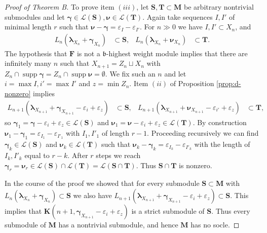 \documentclass[11pt,fleqn]{amsart}
\renewcommand\epsilon{\varepsilon}
\theoremstyle{definition}
\theoremstyle{remark}
\theoremstyle{remark}
\newcommand\lie[1]{\mathfrak{#1}}
\newcommand\wt[1]{\boldsymbol{#1}}
\DeclareMathOperator\supp{supp}
\begin{document}
\begin{proof}[Proof of Theorem B]
To prove item $(iii)$, let $\mathbf S, \mathbf T \subset \mathbf M$ be arbitrary
nontrivial submodules and let $\wt\gamma \in \mathcal L(\mathbf S), \wt\nu \in 
\mathcal L(\mathbf T)$. Again take sequences $I,I'$ of minimal length $r$ such 
that $\wt\nu - \wt\gamma = \epsilon_I - \epsilon_{I'}$.
For $n \gg 0$ we have $I, I' \subset X_n$, and
\begin{align*}
  L_n(\wt\lambda_{X_n} + \wt\gamma_{X_n}) &\subset \mathbf S,
    &   L_n(\wt\lambda_{X_n} + \wt\nu_{X_n}) &\subset \mathbf T.
\end{align*}
The hypothesis that $\mathbf F$ is not a $\lie b$-highest weight module implies 
that there are infinitely many $n$ such that $X_{n+1} = Z_n \sqcup X_n$ with 
$Z_n \cap \supp \wt\gamma = Z_n \cap \supp \wt\nu = \emptyset$. We fix such an 
$n$ and let $i = \max I, i' = \max I'$ and $z = \min Z_n$. Item $(ii)$ of 
Proposition \ref{prop:d-nonzero} implies 
\begin{align*}
  L_{n+1}(\wt\lambda_{X_{n+1}} + \wt\gamma_{X_{n+1}} - \epsilon_i + \epsilon_z) 
    &\subset \mathbf S,
    &   L_{n+1}(\wt\lambda_{X_{n+1}} + \wt\nu_{X_{n+1}} - \epsilon_{i'} + 
      \epsilon_z) 
    &\subset \mathbf T,
\end{align*}
so $\wt\gamma_1 = \wt\gamma - \epsilon_i + \epsilon_z \in \mathcal L(\mathbf 
S)$ and $\wt\nu_1 = \wt\nu - \epsilon_i + \epsilon_z \in \mathcal L(\mathbf T)$.
By construction $\wt\nu_1 - \wt\gamma_1 = \epsilon_{I_1} - \epsilon_{I'_1}$ 
with $I_1, I'_1$ of length $r-1$. Proceeding recursively we can find 
$\wt\gamma_k \in \mathcal L(\mathbf S)$ and $\wt\nu_k \in \mathcal L(\mathbf 
T)$ such that $\wt\nu_k - \wt\gamma_k = \epsilon_{I_k} - \epsilon_{I'_k}$ with 
the length of $I_k, I'_k$ equal to $r - k$. After $r$ steps we reach 
$\wt\gamma_r = \wt\nu_r \in \mathcal L(\mathbf S) \cap \mathcal L(\mathbf T) = 
\mathcal L(\mathbf S \cap \mathbf T)$. Thus $\mathbf S \cap \mathbf T$ is 
nonzero. 

In the course of the proof we showed that for every submodule $\mathbf S \subset
\mathbf M$ with $L_n(\wt\lambda_{X_n} + \wt\gamma_{X_n}) \subset \mathbf S$ we 
also have $L_{n+1}(\wt\lambda_{X_{n+1}} + \wt\gamma_{X_{n+1}} - \epsilon_i + 
\epsilon_z) \subset \mathbf S$. This implies that $\mathbf K(n+1,
\wt\gamma_{X_{n+1}} - \epsilon_i + \epsilon_z)$ is a strict submodule of 
$\mathbf S$. Thus every submodule of $\mathbf M$ has a nontrivial submodule, 
and hence $\mathbf M$ has no socle.
\end{proof}
\end{document}
